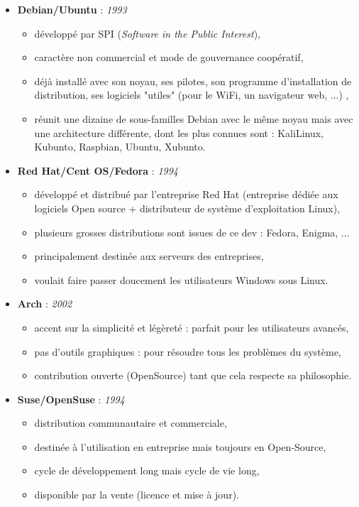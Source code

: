 \begin{itemize}
\item \textbf{Debian/Ubuntu} : \textit{1993}
    \begin{itemize}
    \item développé par SPI (\textit{Software in the Public Interest}),
	\item caractère non commercial et mode de gouvernance coopératif,
	\item déjà installé avec son noyau, ses pilotes, son programme d'installation de distribution, ses logiciels "utiles" (pour le WiFi, un navigateur web, ...) ,
	\item réunit une dizaine de sous-familles Debian avec le même noyau mais avec une architecture différente, dont les plus connues sont : KaliLinux, Kubunto, Raspbian, Ubuntu, Xubunto.\newline
    \end{itemize}

\item \textbf{Red Hat/Cent OS/Fedora} : \textit{1994}
    \begin{itemize}
	\item développé et distribué par l'entreprise Red Hat (entreprise dédiée aux logiciels Open source +
   distributeur de système d'exploitation Linux),
	\item plusieurs grosses distributions sont issues de ce dev : Fedora, Enigma, ...
	\item principalement destinée aux serveurs des entreprises,
	\item voulait faire passer doucement les utilisateurs Windows sous Linux.\newline
	\end{itemize}

\item \textbf{Arch} : \textit{2002}
    \begin{itemize}
	\item accent sur la simplicité et légèreté : parfait pour les utilisateurs avancés,
	\item pas d'outils graphiques : pour résoudre tous les problèmes du système,
	\item contribution ouverte (OpenSource) tant que cela respecte sa philosophie.\newline
	\end{itemize}

\item \textbf{Suse/OpenSuse} : \textit{1994}
    \begin{itemize}
	\item distribution communautaire et commerciale,
	\item destinée à l'utilisation en entreprise mais toujours en Open-Source,
	\item cycle de développement long mais cycle de vie long,
	\item disponible par la vente (licence et mise à jour).
	\end{itemize}
\end{itemize}
